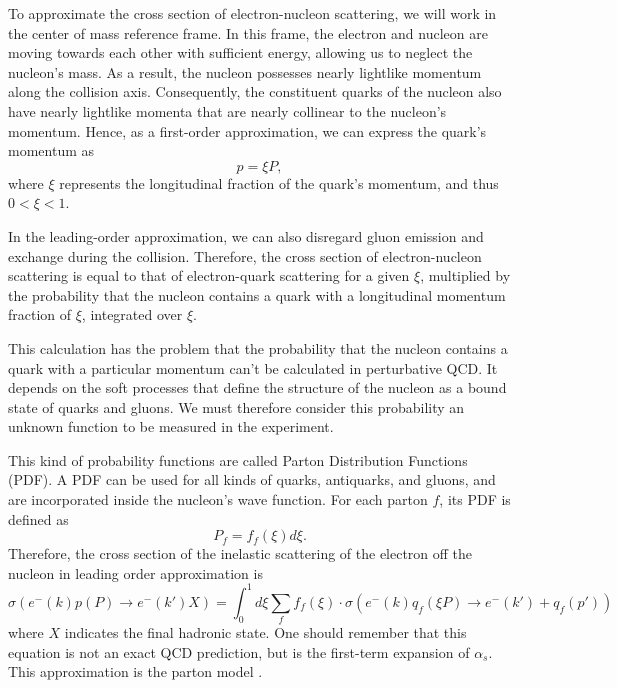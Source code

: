 To approximate the cross section of electron-nucleon scattering, we will work in the center of mass reference frame.
In this frame, the electron and nucleon are moving towards each other with sufficient energy, allowing us to neglect the nucleon's mass.
As a result, the nucleon possesses nearly lightlike momentum along the collision axis.
Consequently, the constituent quarks of the nucleon also have nearly lightlike momenta that are nearly collinear to the nucleon's momentum.
Hence, as a first-order approximation, we can express the quark's momentum as
\begin{equation*}
    p = \xi P,
\end{equation*}
where $\xi$ represents the longitudinal fraction of the quark's momentum, and thus $0 < \xi < 1$.

In the leading-order approximation, we can also disregard gluon emission and exchange during the collision.
Therefore, the cross section of electron-nucleon scattering is equal to that of electron-quark scattering for a given $\xi$, multiplied by the probability that the nucleon contains a quark with a longitudinal momentum fraction of $\xi$, integrated over $\xi$.

This calculation has the problem that the probability that the nucleon contains a quark with a particular momentum can't be calculated in perturbative QCD.
It depends on the soft processes that define the structure of the nucleon as a bound state of quarks and gluons.
We must therefore consider this probability an unknown function to be measured in the experiment.

This kind of probability functions are called Parton Distribution Functions (PDF).
A PDF can be used for all kinds of quarks, antiquarks, and gluons, and are incorporated inside the nucleon's wave function.
For each parton $f$, its PDF is defined as
\begin{equation*}
    P_f = f_f(\xi)d\xi.
\end{equation*}
Therefore, the cross section of the inelastic scattering of the electron off the nucleon in leading order approximation is
\begin{equation*}
    \sigma\left( e^-(k) p(P) \rightarrow e^-(k') X \right) =
            \int_0^1d\xi \sum_f f_f(\xi) \cdot
            \sigma\left( e^-(k) q_f(\xi P) \rightarrow e^-(k') + q_f(p') \right)
\end{equation*}
where $X$ indicates the final hadronic state.
One should remember that this equation is not an exact QCD prediction, but is the first-term expansion of $\alpha_s$.
This approximation is the parton model \cite{halzen1991}.
